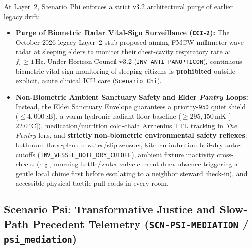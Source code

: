 At Layer~2, Scenario~Phi enforces a strict v3.2 architectural purge of earlier legacy drift:
\begin{itemize}
    \item \textbf{Purge of Biometric Radar Vital-Sign Surveillance (\texttt{CCI-2}):} The October 2026 legacy Layer~2 stub proposed aiming FMCW millimeter-wave radar at sleeping elders to monitor their chest-cavity respiratory rate at $f_s \ge 1\,\mathrm{Hz}$. Under Horizon Council v3.2 (\texttt{INV\_ANTI\_PANOPTICON}), continuous biometric vital-sign monitoring of sleeping citizens is \textbf{prohibited} outside explicit, acute clinical ICU care (\texttt{Scenario Chi}).
    \item \textbf{Non-Biometric Ambient Sanctuary Safety and Elder \textit{Pantry} Loops:} Instead, the Elder Sanctuary Envelope guarantees a priority-\texttt{950} quiet shield ($\le 4{,}000\,\mathrm{cB}$), a warm hydronic radiant floor baseline ($\ge 295{,}150\,\mathrm{mK}$ [$22.0\,^\circ\mathrm{C}$]), medication/nutrition cold-chain Arrhenius TTL tracking in \textit{The Pantry} lens, and \textbf{strictly non-biometric environmental safety reflexes}: bathroom floor-plenum water/slip sensors, kitchen induction boil-dry auto-cutoffs (\texttt{INV\_VESSEL\_BOIL\_DRY\_CUTOFF}), ambient fixture inactivity cross-checks (e.g., morning kettle/water-valve current draw absence triggering a gentle local chime first before escalating to a neighbor steward check-in), and accessible physical tactile pull-cords in every room.
\end{itemize}

\subsection{Scenario Psi: Transformative Justice and Slow-Path Precedent Telemetry (\texttt{SCN-PSI-MEDIATION} / \texttt{psi\_mediation})}

